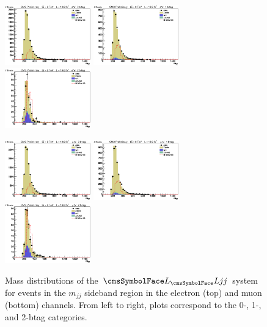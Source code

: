 \begin{figure}[htb]
\begin{center}
\centerline{
\includegraphics[width=0.33\textwidth]{presentation/defense/images/final/0/el/mZZ_sideband.eps}
\includegraphics[width=0.33\textwidth]{presentation/defense/images/final/1/el/mZZ_sideband.eps}
\includegraphics[width=0.33\textwidth]{presentation/defense/images/final/2/el/mZZ_sideband.eps}
}
\centerline{
\includegraphics[width=0.33\textwidth]{presentation/defense/images/final/0/mu/mZZ_sideband.eps}
\includegraphics[width=0.33\textwidth]{presentation/defense/images/final/1/mu/mZZ_sideband.eps}
\includegraphics[width=0.33\textwidth]{presentation/defense/images/final/2/mu/mZZ_sideband.eps}
}
\caption{Mass distributions of the $\LL jj$ system for events in the $m_{jj}$ sideband region in the electron (top) and muon (bottom) channels. From left to right, plots correspond to the 0-, 1-, and 2-btag categories.}
\label{fig:llqqSB}
\end{center}
\end{figure}
